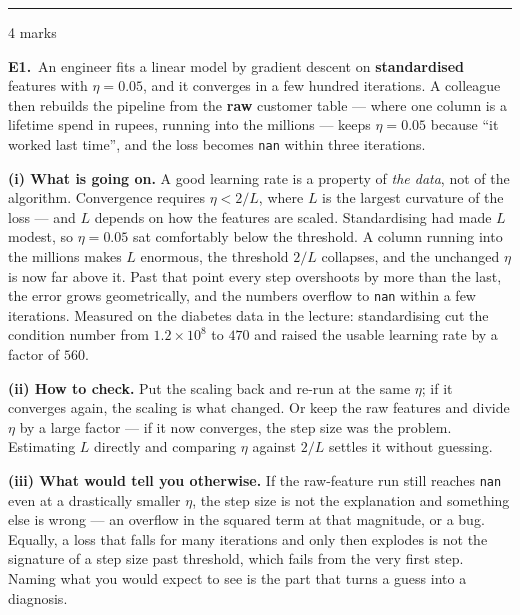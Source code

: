 \documentclass[10pt,a4paper]{article}
\newcommand{\parthead}[2]{\vspace{2pt}\noindent\rule{\linewidth}{0.4pt}\par\vspace{2pt}%
  \noindent{\bfseries Part #1}\hfill{\small #2}\par\vspace{1pt}}
\begin{document}
\newpage

\parthead{E --- Reasoning}{4 marks}

\textbf{E1.}\ An engineer fits a linear model by gradient descent on \textbf{standardised} features with
$\eta = 0.05$, and it converges in a few hundred iterations. A colleague then rebuilds the pipeline from the
\textbf{raw} customer table --- where one column is a lifetime spend in rupees, running into the millions ---
keeps $\eta = 0.05$ because ``it worked last time'', and the loss becomes \texttt{nan} within three
iterations.

\vspace{4pt}

\textbf{(i) What is going on.} A good learning rate is a property of \emph{the data}, not of the algorithm. Convergence requires $\eta < 2/L$, where $L$ is the largest curvature of the loss --- and $L$ depends on how the features are scaled. Standardising had made $L$ modest, so $\eta = 0.05$ sat comfortably below the threshold. A column running into the millions makes $L$ enormous, the threshold $2/L$ collapses, and the unchanged $\eta$ is now far above it. Past that point every step overshoots by more than the last, the error grows geometrically, and the numbers overflow to \texttt{nan} within a few iterations. Measured on the diabetes data in the lecture: standardising cut the condition number from $1.2 \times 10^{8}$ to $470$ and raised the usable learning rate by a factor of $560$.\par\vspace{1mm}\textbf{(ii) How to check.} Put the scaling back and re-run at the same $\eta$; if it converges again, the scaling is what changed. Or keep the raw features and divide $\eta$ by a large factor --- if it now converges, the step size was the problem. Estimating $L$ directly and comparing $\eta$ against $2/L$ settles it without guessing.\par\vspace{1mm}\textbf{(iii) What would tell you otherwise.} If the raw-feature run still reaches \texttt{nan} even at a drastically smaller $\eta$, the step size is not the explanation and something else is wrong --- an overflow in the squared term at that magnitude, or a bug. Equally, a loss that falls for many iterations and only then explodes is not the signature of a step size past threshold, which fails from the very first step. Naming what you would expect to see is the part that turns a guess into a diagnosis.

\vfill
\end{document}
